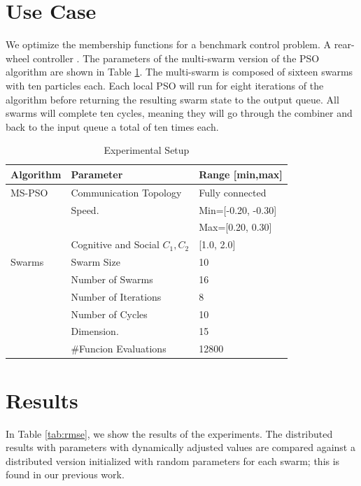 \documentclass[graybox]{svmult}
\begin{document}
\section{Use Case}\label{sub:use_case}

We optimize the membership functions for a benchmark control problem. A rear-wheel controller \cite{paden_survey_2016}. The parameters of the multi-swarm version of the PSO algorithm are shown in Table  \ref{tab:alg_params}.
The multi-swarm is composed of sixteen swarms with ten particles each. Each local PSO will run for eight iterations of the algorithm before returning the resulting swarm state to the output queue. All swarms will complete ten cycles, meaning they will go through the combiner and back to the input queue a total of ten times each.


\begin{table}[htbp] 
\caption{Experimental Setup}\label{tab:alg_params}
\setlength{\tabcolsep}{10pt}
\begin{tabular}{l l l}
\hline
\textbf{Algorithm} & \textbf{Parameter}	& \textbf{Range [min,max]}\\ \hline
MS-PSO & Communication Topology & Fully connected  \\
& Speed.       & Min=[-0.20, -0.30] \\
&              & Max=[0.20, 0.30]  \\
& Cognitive and Social $C_1,C_2$ &  [1.0, 2.0]  \\ \hline
Swarms      & Swarm Size              & 10  \\
            & Number of Swarms        & 16 \\
            & Number of Iterations    &  8 \\
            & Number of Cycles        & 10   \\
            & Dimension.              & 15   \\   
            & \#Funcion Evaluations           & 12800 \\ \hline
\end{tabular}
\end{table}

\section{Results}\label{sec:results}

In Table \ref{tab:rmse}, we show the results of the experiments. The distributed results with parameters with dynamically adjusted values are compared against a distributed version initialized with random parameters for each swarm; this is found in our previous work.
\end{document}
